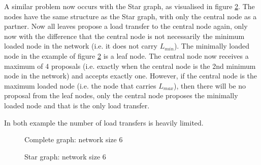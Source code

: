A similar problem now occurs with the Star graph, as visualised in figure \ref{fig:specialstargraphDemo}. The nodes have the same structure as the Star graph, with only the central node as a partner. Now all leaves propose a load transfer to the central node again, only now with the difference that the central node is not necessarily the minimum loaded node in the network (i.e. it does not carry $L_{min}$). The minimally loaded node in the example of figure \ref{fig:specialstargraphDemo} is a leaf node. The central node now receives a maximum of 4 proposals (i.e. exactly when the central node is the 2nd minimum node in the network) and accepts exactly one. However, if the central node is the maximum loaded node (i.e. the node that carries $L_{max}$), then there will be no proposal from the leaf nodes, only the central node proposes the minimally loaded node and that is the only load transfer.

In both example the number of load transfers is heavily limited.
\begin{figure}[]
    \centering
    
    \caption{Complete graph: network size 6}
    \label{fig:specialcompletegraphDemo}
\end{figure}
\begin{figure}[]
    \centering
    
    \caption{Star graph: network size 6}
    \label{fig:specialstargraphDemo}
\end{figure}